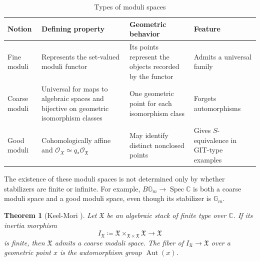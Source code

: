 \documentclass{amsart}
\newtheorem{thm}{Theorem}[section]
\theoremstyle{definition}
\theoremstyle{remark}
\theoremstyle{plain}
\theoremstyle{definition}
\theoremstyle{remark}
\newcommand{\G}{\mathbb{G}}
\newcommand{\C}{\mathbb{C}}
\newcommand{\mc}[1]{\mathcal{#1}}
\newcommand{\mf}[1]{\mathfrak{#1}}
\newcommand{\on}[1]{\operatorname{#1}}
\newcommand{\1}{\mathbf{1}}
\newcommand{\2}{\mathbf{2}}
\newcommand{\3}{\mathbf{3}}
\begin{document}
\begin{table}[htpb]
    \centering
    \caption{Types of moduli spaces}
    \label{tab:moduli-types-corrected}
    \renewcommand{\arraystretch}{1.3}
    \begin{tabular}{
        p{}
        p{}
        p{}
        p{}
    }
        \toprule
        \textbf{Notion}
        & \textbf{Defining property}
        & \textbf{Geometric behavior}
        & \textbf{Feature}
        \\
        \midrule
        Fine moduli
        & Represents the set-valued moduli functor
        & Its points represent the objects recorded by the functor
        & Admits a universal family
        \\
        Coarse moduli
        & Universal for maps to algebraic spaces and bijective on geometric isomorphism classes
        & One geometric point for each isomorphism class
        & Forgets automorphisms
        \\
        Good moduli
        & Cohomologically affine and
          \(\mc{O}_X \simeq q_*\mc{O}_{\mf{X}}\)
        & May identify distinct nonclosed points
        & Gives \(S\)-equivalence in GIT-type examples
        \\
        \bottomrule
    \end{tabular}
\end{table}

The existence of these moduli spaces is not determined only by whether stabilizers are finite or infinite. For example, \(B\G_m\to\on{Spec}\C\) is both a coarse moduli space and a good moduli space, even though its stabilizer is \(\G_m\).

\begin{thm}[Keel-Mori {\cite{KeelMori1997}}]
    Let \(\mf{X}\) be an algebraic stack of finite type over \(\C\). If its inertia morphism
    \[
        I_{\mf{X}}
        \coloneqq
        \mf{X}\times_{\mf{X}\times\mf{X}}\mf{X}
        \longrightarrow \mf{X}
    \]
    is finite, then \(\mf{X}\) admits a coarse moduli space. The fiber of \(I_{\mf{X}}\to\mf{X}\) over a geometric point \(x\) is the automorphism group \(\on{Aut}(x)\).
\end{thm}
\end{document}
